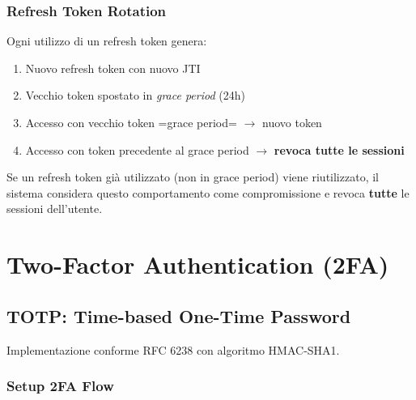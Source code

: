 \documentclass[12pt,a4paper]{report}
\begin{document}
\subsection{Refresh Token Rotation}

Ogni utilizzo di un refresh token genera:
\begin{enumerate}
    \item Nuovo refresh token con nuovo JTI
    \item Vecchio token spostato in \textit{grace period} (24h)
    \item Accesso con vecchio token =grace period= $\rightarrow$ nuovo token
    \item Accesso con token precedente al grace period $\rightarrow$ \textbf{revoca tutte le sessioni}
\end{enumerate}

\begin{warnbox}
Se un refresh token già utilizzato (non in grace period) viene riutilizzato, il sistema considera questo comportamento come compromissione e revoca \textbf{tutte} le sessioni dell'utente.
\end{warnbox}

\chapter{Two-Factor Authentication (2FA)}

\section{TOTP: Time-based One-Time Password}

Implementazione conforme RFC 6238 con algoritmo HMAC-SHA1.

\subsection{Setup 2FA Flow}
\end{document}
